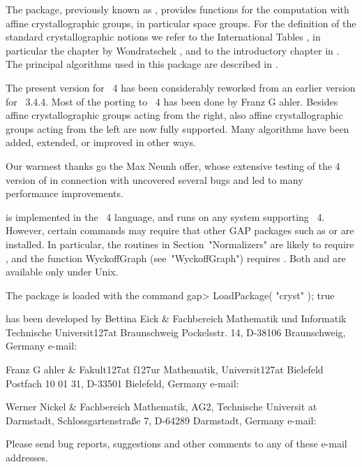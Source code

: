 

The {\Cryst} package, previously known as , provides 
functions for the computation with affine crystallographic groups, 
in particular space groups. For the definition of the standard 
crystallographic notions we refer to the International Tables 
\cite{Hah95}, in particular the chapter by Wondratschek \cite{Won95},
and to the introductory chapter in \cite{BBNWZ78}. The principal 
algorithms used in this package are described in \cite{EGN97}.

The present version for {\GAP}~4 has been considerably reworked from
an earlier version for {\GAP}~3.4.4. Most of the porting to {\GAP}~4
has been done by Franz G{ a}hler. Besides affine crystallographic
groups acting from the right, also affine crystallographic groups acting 
from the left are now fully supported. Many algorithms have been added, 
extended, or improved in other ways.

Our warmest thanks go the Max Neunh{ o}ffer, whose extensive
testing of the {\GAP} 4 version of {\Cryst} in connection with {\XGAP} 
uncovered several bugs and led to many performance improvements.

{\Cryst} is implemented in the {\GAP}~4 language, and runs on any 
system supporting {\GAP}~4. However, certain commands may require 
that other GAP packages such as {\CARAT} or {\XGAP} are installed.
In particular, the routines in Section~"Normalizers" are likely
to require {\CARAT}, and the function WyckoffGraph (see~"WyckoffGraph")
requires {\XGAP}. Both {\CARAT} and {\XGAP} are available only under Unix.

The {\Cryst} package is loaded with the command
\beginexample 
gap> LoadPackage( "cryst" ); 
true
\endexample

{\Cryst} has been developed by
\beginitems
Bettina Eick &
Fachbereich Mathematik und Informatik\hfil\break
Technische Universit\accent127at Braunschweig\hfil\break
Pockelsstr. 14, D-38106 Braunschweig, Germany\hfil\break
e-mail: 

Franz G{ a}hler &
Fakult\accent127at f\accent127ur Mathematik, 
Universit\accent127at Bielefeld\hfil\break
Postfach 10 01 31, D-33501 Bielefeld, Germany\hfil\break
e-mail: 

Werner Nickel &
Fachbereich Mathematik, AG2,
Technische Universit{ a}t Darmstadt, \hfill\break
Schlossgartenstra{\ss}e 7, D-64289 Darmstadt, Germany \hfil\break
e-mail: 
\enditems

Please send bug reports, suggestions and other comments to any of these
e-mail addresses.







